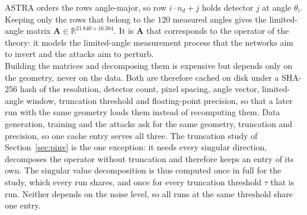 \documentclass{article}
\numberwithin{equation}{section}
\begin{document}
ASTRA orders the rows angle-major, so row $i\cdot n_d+j$ holds detector
$j$ at angle $\theta_i$. Keeping only the rows that belong to the $120$ measured angles gives the limited-angle matrix
$\mathbf{A}\in\mathbb{R}^{21\,840\times16\,384}$.
It is $\mathbf{A}$ that corresponds to the operator of the theory:
it models the limited-angle measurement process that the networks aim to invert and the attacks aim to perturb.\\
Building the matrices and decomposing them is expensive but depends only on the
geometry, never on the data. Both are therefore cached on disk under a SHA-256
hash of the resolution, detector count, pixel spacing, angle vector,
limited-angle window, truncation threshold and floating-point precision, so that
a later run with the same geometry loads them instead of recomputing them.
Data generation, training and the attacks ask for the same geometry, truncation and
precision, so one cache entry serves all three. The truncation study of
Section~\ref{sec:pinv} is the one exception: it needs every singular direction, decomposes the operator
without truncation and therefore keeps an entry of its own. The singular value decomposition
is thus computed once in full for the study, which every run shares, and once for every truncation
threshold $\tau$ that is run. Neither depends on the noise level, so all runs at the same threshold
share one entry.\\
\end{document}
